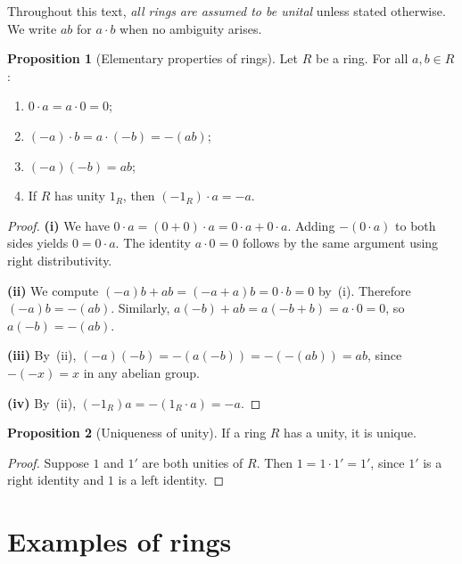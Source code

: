 \documentclass[12pt,a4paper,openany]{book}
\theoremstyle{definition}
\newtheorem{proposition}{Proposition}[chapter]
\theoremstyle{remark}
\begin{document}
Throughout this text, \emph{all rings are assumed to be unital} unless stated otherwise. We write $ab$ for $a\cdot b$ when no ambiguity arises.

\begin{proposition}[Elementary properties of rings]\label{prop:ring-elementary}
Let $R$ be a ring. For all $a,b\in R$:
\begin{enumerate}[label=(\roman*)]
    \item $0\cdot a = a\cdot 0 = 0$;
    \item $(-a)\cdot b = a\cdot(-b) = -(ab)$;
    \item $(-a)(-b)=ab$;
    \item If $R$ has unity $1_R$, then $(-1_R)\cdot a = -a$.
\end{enumerate}
\end{proposition}

\begin{proof}
\textbf{(i)} We have $0\cdot a = (0+0)\cdot a = 0\cdot a + 0\cdot a$. Adding $-(0\cdot a)$ to both sides yields $0 = 0\cdot a$. The identity $a\cdot 0=0$ follows by the same argument using right distributivity.

\textbf{(ii)} We compute $(-a)b + ab = (-a+a)b = 0\cdot b = 0$ by~(i). Therefore $(-a)b = -(ab)$. Similarly, $a(-b)+ab=a(-b+b)=a\cdot 0=0$, so $a(-b)=-(ab)$.

\textbf{(iii)} By~(ii), $(-a)(-b) = -(a(-b)) = -(-(ab)) = ab$, since $-(-x)=x$ in any abelian group.

\textbf{(iv)} By~(ii), $(-1_R)a = -(1_R\cdot a) = -a$.
\end{proof}

\begin{proposition}[Uniqueness of unity]\label{prop:unity-unique}
If a ring $R$ has a unity, it is unique.
\end{proposition}

\begin{proof}
Suppose $1$ and $1'$ are both unities of $R$. Then $1 = 1\cdot 1' = 1'$, since $1'$ is a right identity and $1$ is a left identity.
\end{proof}

\section{Examples of rings}\label{sec:ring-examples}
\end{document}
